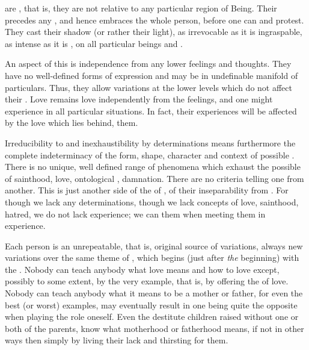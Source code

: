 \pa %
 are , that is, they are not relative to any
particular region of Being. Their  precedes any 
, and hence embraces the whole person, before one can 
and protest. They cast their shadow (or rather their light), as irrevocable as it is
ingraspable, as intense as it is , on all particular beings and
.

An aspect of this  is independence from any lower 
feelings and thoughts. They have no well-defined forms of expression 
and may be  in undefinable manifold of particulars. 
Thus, they allow variations at the lower levels which do not 
affect their . Love remains love independently from the 
feelings,  and  one might 
experience in all particular situations. In fact, their experiences 
will be affected by the love which lies behind,  them.

Irreducibility to and inexhaustibility by  determinations means
furthermore the complete indeterminacy of the form, shape, character and context of
possible .  There is no unique, well defined range
of phenomena which exhaust the possible  of
sainthood, love, ontological , damnation. There are no 
criteria telling one from another.  This is just another side of the
 of , of their inseparability from
.  For though we lack any  determinations,
though we lack concepts of love, sainthood, hatred, we do not lack
experience; we can  them
when meeting them in experience.

\pa
Each person is an unrepeatable, that is, original source of variations, always
new variations over the same theme of , which
begins (just after {\em the} beginning) with the .  Nobody can
teach anybody what love means and 
how to love except, possibly to some extent, by the very example, that is, by
offering the  of love.  Nobody can teach anybody what
it means to be a mother or father, for even the best (or worst) examples, may
eventually result in one being quite the opposite when 
playing the role oneself.  Even the destitute children raised without one
or both of the parents, know what motherhood or fatherhood means, if not in
other ways then simply by living their lack and thirsting for them.

